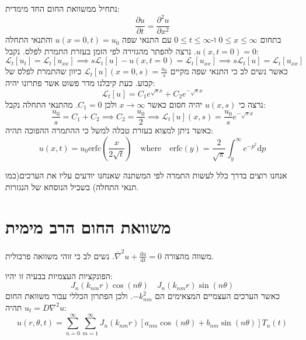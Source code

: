 \documentclass{tstextbook}
\begin{document}
\begin{example}
נתחיל ממשוואת החום החד מימדית:
$$\frac{\partial u}{\partial t} =\frac{\partial^{2}u}{\partial x^{2}} $$
בתחום \(0\leq x \leq \infty\) ו-\(0\leq t\leq \infty\) עם התנאי שפה \(u(x=0,t)=u_{0}\) והתנאי התחלה \(u(x,t=0)=0\). נרצה להפתר מהגזירה לפי הזמן בעזרת התמרת לפלס. נקבל:
$$\mathcal{L}_{t}[u_{t}]=\mathcal{L}_{t}[u_{x x}]\implies s\mathcal{L}_{t}[u]-u(x,t=0)=\mathcal{L}_{t}[u_{x x}]\implies s \mathcal{L}_{t}[u] = \mathcal{L}_{t}[u_{x x}]$$
כאשר נשים לב כי התנאי שפה מקיים \(\mathcal{L}_{t}[u](x=0,s)=\frac{u_{0}}{s}\) כיוון שהתמרת לפלס של קבוע. כעת קיבלנו מדר פשוט אשר פתרונו יהיה:
$$\mathcal{L}_{t}[u_{}]= C_{1}e^{ \sqrt{ s }x }+C_{2}e^{ -\sqrt{ s }x }$$
נרצה כי \(u(x,s)\) יהיה חסום כאשר \(x\to \infty\) ולכן \(C_{1} = 0\). מהתנאי התחלה נקבל:
$$\frac{u_{0}}{s}=C_{1}+C_{2}\implies C_{2}=\frac{u_{0}}{2}\implies \mathcal{L}_{t}[u](x,s)=\frac{u_{0}}{s}e^{ -\sqrt{ s }x }$$
כאשר ניתן למצוא בעזרת טבלה למשל כי ההתמרה ההפוכה תהיה:
$$u(x,t)=u_{0}\mathrm{erfc}\left( \frac{x}{2\sqrt{ t }} \right)\quad \mathrm{where}\quad \mathrm{erfc}(y)=\frac{2}{\sqrt{ \pi }}\int_{y}^{\infty}e^{ -p^{2} }\mathrm{d}p$$

\end{example}
\begin{remark}
אנחנו רוצים בדרך כלל לעשות התמרה לפי המשתנה שאנחנו יודעים עליו את הערכים(כמו תנאי התחלה) בשביל הנוסחא של הנגזרות.

\end{remark}
\section{משוואת החום הרב מימית}

\begin{definition}
משווה מהצורה \(\bar{\nabla}^2u+\frac{\mathrm{d} u}{\mathrm{d} t}=0\). נשים לב כי זוהי משוואה פרבולית.

\end{definition}
\begin{proposition}
הפונקציות העצמיות בבעיה זו יהיו:
$$J_{n}\left(k_{nm}r\right)\cos\left(n\theta\right)\quad J_{n}\left(k_{nm}r\right)\sin\left(n\theta\right)$$
כאשר הערכים העצמיים המצאימים הם \(-k_{nm}^2\).
ולכן הפתרון הכללי עבור משוואת החום \(u_t=D\nabla^2 u\) תהיה:
$$u(r,\theta,t)=\sum_{n=0}^{\infty}\sum_{m=1}^{\infty}J_{n}(k_{nm}r)[a_{nm}\cos(n\theta)+b_{nm}\sin(n\theta)]T_{n}(t)$$

\end{proposition}
\end{document}

